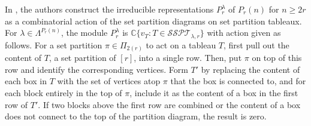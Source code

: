 \documentclass[10pt]{amsart}
\theoremstyle{definition}
\theoremstyle{definition}
\theoremstyle{plain}
\theoremstyle{remark}
\theoremstyle{plain}
\theoremstyle{plain}
\newcommand{\C}{\mathbb{C}}
\newcommand{\SSPT}{\mathcal{SSPT}}
\begin{document}
In \cite{Halverson2018SetpartitionTA}, the authors construct the irreducible representations $P_r^\lambda$ of $P_r(n)$ for $n\geq 2r$ as a combinatorial action of the set partition diagrams on set partition tableaux. For $\lambda\in\Lambda^{P_r(n)}$, the module $P_r^\lambda$ is $\C\{v_T:T\in\SSPT_{\lambda,r}\}$ with action given as follows. For a set partition $\pi\in\Pi_{2(r)}$ to act on a tableau $T$, first pull out the content of $T$, a set partition of $[r]$, into a single row. Then, put $\pi$ on top of this row and identify the corresponding vertices. Form $T'$ by replacing the content of each box in $T$ with the set of vertices atop $\pi$ that the box is connected to, and for each block entirely in the top of $\pi$, include it as the content of a box in the first row of $T'$. If two blocks above the first row are combined or the content of a box does not connect to the top of the partition diagram, the result is zero.
\end{document}
